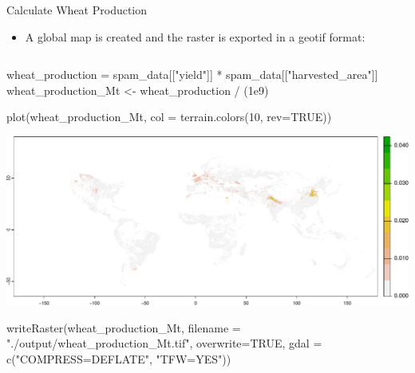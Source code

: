 \documentclass[
  ignorenonframetext,
  aspectratio=169,
]{beamer}
\newenvironment{Shaded}{\begin{snugshade}}{\end{snugshade}}
\newcommand{\AttributeTok}[1]{\textcolor[rgb]{0.40,0.45,0.13}{#1}}
\newcommand{\ConstantTok}[1]{\textcolor[rgb]{0.56,0.35,0.01}{#1}}
\newcommand{\DecValTok}[1]{\textcolor[rgb]{0.68,0.00,0.00}{#1}}
\newcommand{\FloatTok}[1]{\textcolor[rgb]{0.68,0.00,0.00}{#1}}
\newcommand{\FunctionTok}[1]{\textcolor[rgb]{0.28,0.35,0.67}{#1}}
\newcommand{\NormalTok}[1]{\textcolor[rgb]{0.00,0.23,0.31}{#1}}
\newcommand{\OtherTok}[1]{\textcolor[rgb]{0.00,0.23,0.31}{#1}}
\newcommand{\SpecialCharTok}[1]{\textcolor[rgb]{0.37,0.37,0.37}{#1}}
\newcommand{\StringTok}[1]{\textcolor[rgb]{0.13,0.47,0.30}{#1}}
\providecommand{\tightlist}{%
  \setlength{\itemsep}{0pt}\setlength{\parskip}{0pt}}\usepackage{longtable,booktabs,array}
\begin{document}
\begin{frame}[fragile]{Calculate Wheat Production}
\protect\hypertarget{calculate-wheat-production-1}{}
\begin{itemize}[<+->]
\tightlist
\item
  A global map is created and the raster is exported in a geotif format:
\end{itemize}

\begin{columns}[T]
\begin{column}{0.8\textwidth}
\linespread{0.5}

\begin{Shaded}
\begin{Highlighting}[]
\NormalTok{wheat\_production }\OtherTok{=}\NormalTok{ spam\_data[[}\StringTok{"yield"}\NormalTok{]] }\SpecialCharTok{*}\NormalTok{ spam\_data[[}\StringTok{"harvested\_area"}\NormalTok{]]}
\NormalTok{wheat\_production\_Mt }\OtherTok{\textless{}{-}}\NormalTok{ wheat\_production }\SpecialCharTok{/}\NormalTok{ (}\FloatTok{1e9}\NormalTok{)}
\end{Highlighting}
\end{Shaded}

\linespread{2}

\linespread{0.5}

\begin{Shaded}
\begin{Highlighting}[]
\FunctionTok{plot}\NormalTok{(wheat\_production\_Mt, }\AttributeTok{col =} \FunctionTok{terrain.colors}\NormalTok{(}\DecValTok{10}\NormalTok{, }\AttributeTok{rev=}\ConstantTok{TRUE}\NormalTok{))}
\end{Highlighting}
\end{Shaded}

\includegraphics{global_n_files/figure-beamer/unnamed-chunk-6-1.pdf}

\linespread{2}

\linespread{0.5}

\begin{Shaded}
\begin{Highlighting}[]
\FunctionTok{writeRaster}\NormalTok{(wheat\_production\_Mt, }\AttributeTok{filename =} \StringTok{"./output/wheat\_production\_Mt.tif"}\NormalTok{, }
            \AttributeTok{overwrite=}\ConstantTok{TRUE}\NormalTok{, }\AttributeTok{gdal =} \FunctionTok{c}\NormalTok{(}\StringTok{"COMPRESS=DEFLATE"}\NormalTok{, }\StringTok{"TFW=YES"}\NormalTok{))}
\end{Highlighting}
\end{Shaded}


\end{column}
\end{columns}
\end{frame}
\end{document}
